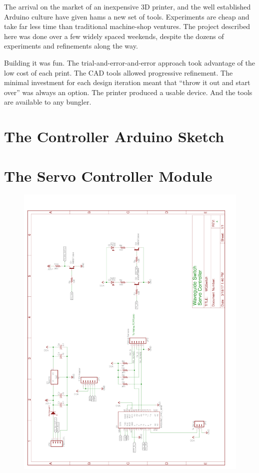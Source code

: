\documentclass[12pt]{article}
\begin{document}
The arrival on the market of
an inexpensive 3D printer, and the well established Arduino
culture have given hams a new set of tools.  Experiments are
cheap and take far less time than traditional machine-shop
ventures. The project described here was done over a few
widely spaced weekends, despite the dozens of experiments
and refinements along the way. 

Building it was fun. The trial-and-error-and-error approach
took advantage of the low cost of each print.
The CAD tools allowed progressive refinement.
The minimal investment for each design iteration meant
that ``throw it out and start over'' was always an option.
The printer produced a usable device. And the
tools are available to any bungler.

\clearpage

\begin{appendices}

\section{\label{a_sketch}The Controller Arduino Sketch}


\clearpage
{}
\section{\label{a_controller_module}The Servo Controller Module}
\begin{figure}[h] 
  \centering
  \includegraphics[width=0.75\linewidth,keepaspectratio]{WGSwitch.pdf}
\end{figure} 




\end{appendices}
\end{document}
